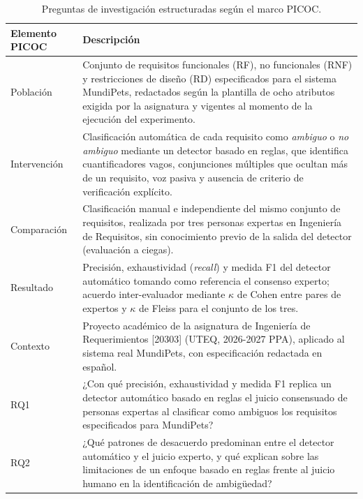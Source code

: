 \documentclass[journal,onecolumn]{IEEEtran}
\begin{document}
	\begin{table}[H]
		\centering
		\caption{Preguntas de investigación estructuradas según el marco PICOC.}
		\label{tab:picoc}
		\small
		\begin{tabularx}{\textwidth}{@{}p{2.6cm} X@{}}
			\toprule
			\textbf{Elemento PICOC} & \textbf{Descripción} \\
			\midrule
			Población & Conjunto de requisitos funcionales (RF), no funcionales
			(RNF) y restricciones de diseño (RD) especificados para el sistema
			MundiPets, redactados según la plantilla de ocho atributos exigida
			por la asignatura y vigentes al momento de la ejecución del
			experimento. \\
			Intervención & Clasificación automática de cada requisito como
			\emph{ambiguo} o \emph{no ambiguo} mediante un detector basado en
			reglas, que identifica cuantificadores vagos, conjunciones
			múltiples que ocultan más de un requisito, voz pasiva y ausencia
			de criterio de verificación explícito. \\
			Comparación & Clasificación manual e independiente del mismo
			conjunto de requisitos, realizada por tres personas expertas en
			Ingeniería de Requisitos, sin conocimiento previo de la salida del
			detector (evaluación a ciegas). \\
			Resultado & Precisión, exhaustividad (\emph{recall}) y medida
			F1 del detector automático tomando como referencia el consenso
			experto; acuerdo inter-evaluador mediante $\kappa$ de Cohen entre
			pares de expertos y $\kappa$ de Fleiss para el conjunto de los
			tres. \\
			Contexto & Proyecto académico de la asignatura de Ingeniería de
			Requerimientos [20303] (UTEQ, 2026-2027 PPA), aplicado al sistema
			real MundiPets, con especificación redactada en español. \\
			\midrule
			RQ1 & ¿Con qué precisión, exhaustividad y medida F1 replica un
			detector automático basado en reglas el juicio consensuado de
			personas expertas al clasificar como ambiguos los requisitos
			especificados para MundiPets? \\
			RQ2 & ¿Qué patrones de desacuerdo predominan entre el detector
			automático y el juicio experto, y qué explican sobre las
			limitaciones de un enfoque basado en reglas frente al juicio
			humano en la identificación de ambigüedad? \\
			\bottomrule
		\end{tabularx}
	\end{table}
	
\end{document}
